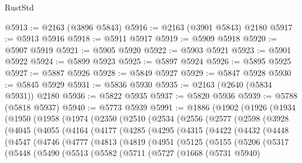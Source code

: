 \begin{lexlean}{RustStd}
\begin{coremodule}
@5913 := @2163 (@3896 @5843)
@5916 := @2163 (@3901 @5843) @2180
@5917 := @5913 @5916
@5918 := @5911 @5917
@5919 := @5909 @5918
@5920 := @5907 @5919
@5921 := @5905 @5920
@5922 := @5903 @5921
@5923 := @5901 @5922
@5924 := @5899 @5923
@5925 := @5897 @5924
@5926 := @5895 @5925
@5927 := @5887 @5926
@5928 := @5849 @5927
@5929 := @5847 @5928
@5930 := @5845 @5929
@5931 := @5836 @5930
@5935 := @2163 (@2640 (@5834 @5931)) @2180
@5936 := @5822 @5935
@5937 := @5820 @5936
@5939 := @5788 (@5818 @5937)
@5940 := @5773 @5939
@5991 := @1886
    (@1902
      (@1926
        (@1934
          (@1950
            (@1958
              (@1974
                (@2350
                  (@2510
                    (@2534
                      (@2556
                        (@2577
                          (@2598
                            (@3928
                              (@4045
                                (@4055
                                  (@4164
                                    (@4177
                                      (@4285
                                        (@4295
                                          (@4315
                                            (@4422
                                              (@4432
                                                (@4448
                                                  (@4547
                                                    (@4746
                                                      (@4777
                                                        (@4813
                                                          (@4819
                                                            (@4951
                                                              (@5125
                                                                (@5155
                                                                  (@5206
                                                                    (@5317
                                                                      (@5448
                                                                        (@5490
                                                                          (@5513
                                                                            (@5582
                                                                              (@5711
                                                                                (@5727
                                                                                  (@1668
                                                                                    (@5731 @5940)

\end{coremodule}
\end{lexlean}

